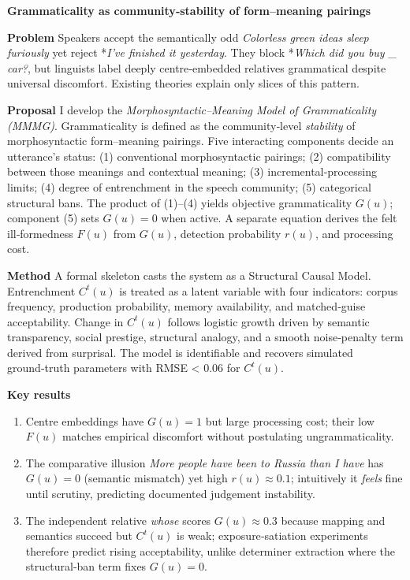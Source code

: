 \documentclass[11pt]{article}
\begin{document}
\begin{center}
\textbf{Grammaticality as community‑stability of form–meaning pairings}
\end{center}

\noindent\textbf{Problem} Speakers accept the semantically odd \emph{Colorless green ideas sleep furiously} yet reject *\emph{I’ve finished it yesterday}.  They block *\emph{Which did you buy \_ car?}, but linguists label deeply centre‑embedded relatives grammatical despite universal discomfort.  Existing theories explain only slices of this pattern.

\medskip
\noindent\textbf{Proposal} I develop the \emph{Morphosyntactic–Meaning Model of Grammaticality (MMMG)}.  
Grammaticality is defined as the community‑level \emph{stability} of morphosyntactic form–meaning pairings.  
Five interacting components decide an utterance’s status:  
(1) conventional morphosyntactic pairings;  
(2) compatibility between those meanings and contextual meaning;  
(3) incremental‑processing limits;  
(4) degree of entrenchment in the speech community;  
(5) categorical structural bans.  
The product of (1)–(4) yields objective grammaticality \(G(u)\); component (5) sets \(G(u)=0\) when active.  
A separate equation derives the felt ill‑formedness \(F(u)\) from \(G(u)\), detection probability \(r(u)\), and processing cost.

\medskip
\noindent\textbf{Method} A formal skeleton casts the system as a Structural Causal Model.  
Entrenchment \(C^{t}(u)\) is treated as a latent variable with four indicators: corpus frequency, production probability, memory availability, and matched‑guise acceptability.  
Change in \(C^{t}(u)\) follows logistic growth driven by semantic transparency, social prestige, structural analogy, and a smooth noise‑penalty term derived from surprisal.  
The model is identifiable and recovers simulated ground‑truth parameters with RMSE < 0.06 for \(C^{t}(u)\).

\medskip
\noindent\textbf{Key results}  
\vspace{-0.4\baselineskip}
\begin{enumerate}
\item Centre embeddings have \(G(u)=1\) but large processing cost; their low \(F(u)\) matches empirical discomfort without postulating ungrammaticality.
\item The comparative illusion \emph{More people have been to Russia than I have} has \(G(u)=0\) (semantic mismatch) yet high \(r(u)\approx0.1\); intuitively it \emph{feels} fine until scrutiny, predicting documented judgement instability.
\item The independent relative \emph{whose} scores \(G(u)\approx0.3\) because mapping and semantics succeed but \(C^{t}(u)\) is weak; exposure‑satiation experiments therefore predict rising acceptability, unlike determiner extraction where the structural‑ban term fixes \(G(u)=0\).
\end{enumerate}
\end{document}
